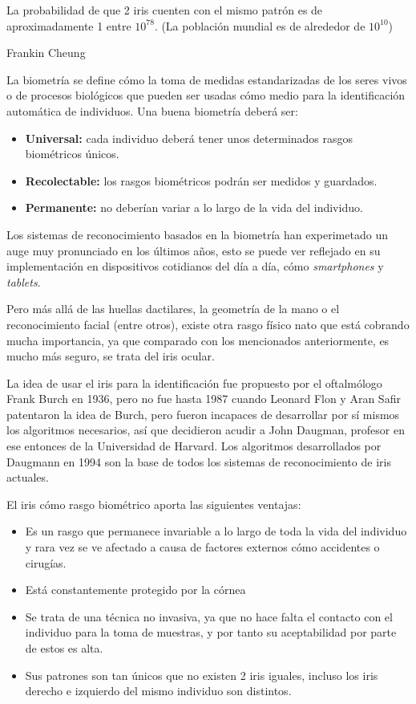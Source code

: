 
\epigraph{La probabilidad de que 2 iris cuenten con el mismo patrón es de aproximadamente 1 entre $10^{78}$. (La población mundial es de alrededor de $10^{10}$)}{Frankin Cheung}

La biometría se define cómo la toma de medidas estandarizadas de los seres vivos o de procesos biológicos \cite{intro:bio-wiki} que pueden ser usadas cómo medio para la identificación automática de individuos. 
Una buena biometría deberá ser:
\begin{itemize}
	\item \textbf{Universal:} cada individuo deberá tener unos determinados rasgos biométricos únicos.
	\item \textbf{Recolectable:} los rasgos biométricos podrán ser medidos y guardados.
	\item \textbf{Permanente:} no deberían variar a lo largo de la vida del individuo.
\end{itemize}
Los sistemas de reconocimiento basados en la biometría han experimetado un auge muy pronunciado en los últimos años, esto se puede ver reflejado en su implementación en dispositivos cotidianos del día a día, cómo \emph{smartphones} y \emph{tablets}.

Pero más allá de las huellas dactilares, la geometría de la mano o el reconocimiento facial (entre otros), existe otra rasgo físico nato que está cobrando mucha importancia, ya que comparado con los mencionados anteriormente, es mucho más seguro, se trata del iris ocular.

La idea de usar el iris para la identificación fue propuesto por el oftalmólogo Frank Burch en 1936, pero no fue hasta 1987 cuando Leonard Flon y Aran Safir patentaron la idea de Burch, pero fueron incapaces de desarrollar por sí mismos los algoritmos necesarios, así que decidieron acudir a John Daugman, profesor en ese entonces de la Universidad de Harvard.
Los algoritmos desarrollados por Daugmann en 1994 son la base de todos los sistemas de reconocimiento de iris actuales\cite{intro:iris-rec}.

El iris cómo rasgo biométrico aporta las siguientes ventajas\cite{intro:iris-bio}:
\begin{itemize}
	\item Es un rasgo que permanece invariable a lo largo de toda la vida del individuo y rara vez se ve afectado a causa de factores externos cómo accidentes o cirugías.
	\item Está constantemente protegido por la córnea
	\item Se trata de una técnica no invasiva, ya que no hace falta el contacto con el individuo para la toma de muestras, y por tanto su aceptabilidad por parte de estos es alta.
	\item Sus patrones son tan únicos que no existen 2 iris iguales, incluso los iris derecho e izquierdo del mismo individuo son distintos.
\end{itemize}

